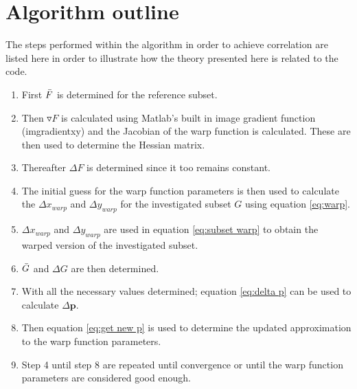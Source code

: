 \documentclass[[12pt,oneside,openany,a4paper, %
\newcommand*\mean[1]{\bar{#1}} %
\begin{document}
\section{Algorithm outline}
The steps performed within the algorithm in order to achieve correlation are listed here in order to illustrate how the theory presented here is related to the code.

\begin{enumerate}
  \item First $\mean{F}$ is determined for the reference subset.
  \item Then $\triangledown F$ is calculated using Matlab's built in image gradient function (imgradientxy) and the Jacobian of the warp function is calculated. These are then used to determine the Hessian matrix.
  \item Thereafter $\Delta F$ is determined since it too remains constant.
  \item The initial guess for the warp function parameters is then used to calculate the $\Delta x_{warp}$ and $\Delta y_{warp}$ for the investigated subset $G$ using equation \ref{eq:warp}.
  \item $\Delta x_{warp}$ and $\Delta y_{warp}$ are used in equation \ref{eq:subset warp} to obtain the warped version of the investigated subset.
  \item $\mean{G}$ and $\Delta G$ are then determined.
  \item With all the necessary values determined; equation \ref{eq:delta p} can be used to calculate $\Delta \bm{p}$.
  \item Then equation \ref{eq:get new p} is used to determine the updated approximation to the warp function parameters.
  \item Step 4 until step 8 are repeated until convergence or until the warp function parameters are considered good enough.
\end{enumerate}
\end{document}
